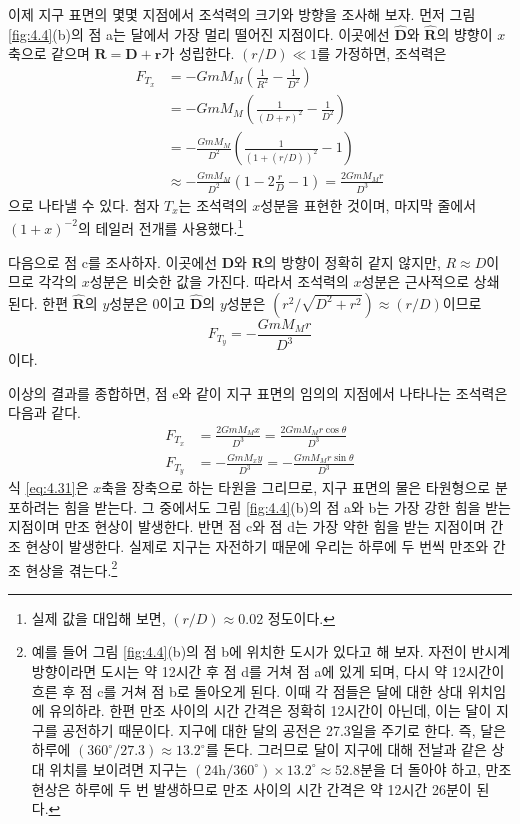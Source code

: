 \documentclass[chapter, oneside, b5paper]{oblivoir}
\theoremstyle{plain}
\theoremstyle{definition}
\theoremstyle{remark}
\begin{document}
이제 지구 표면의 몇몇 지점에서 조석력의 크기와 방향을 조사해 보자. 먼저 그림 \ref{fig:4.4}(b)의 점 a는 달에서 가장 멀리 떨어진 지점이다. 이곳에선 $\mathbf{\hat{D}}$와 $\mathbf{\hat{R}}$의 뱡향이 $x$축으로 같으며 $\mathbf{R} = \mathbf{D} + \mathbf{r}$가 성립한다. $(r/D) \ll 1$를 가정하면, 조석력은
\begin{equation}
\begin{aligned}
    F_{T_x} &= -GmM_M \left( \frac{1}{R^2} - \frac{1}{D^2} \right) \\
    &= -GmM_M \left( \frac{1}{(D+r)^2} - \frac{1}{D^2} \right) \\
    &= -\frac{GmM_M}{D^2} \left( \frac{1}{(1+(r/D))^2} - 1 \right) \\
    &\approx -\frac{GmM_M}{D^2} \left( 1-2\frac{r}{D}- 1 \right) = \frac{2GmM_Mr}{D^3}
\end{aligned}
\label{eq:4.29}
\end{equation}
으로 나타낼 수 있다. 첨자 $T_x$는 조석력의 $x$성분을 표현한 것이며, 마지막 줄에서 $(1+x)^{-2}$의 테일러 전개를 사용했다.\footnote{실제 값을 대입해 보면, $(r/D) \approx 0.02$ 정도이다.}

다음으로 점 c를 조사하자. 이곳에선 $\mathbf{D}$와 $\mathbf{R}$의 방향이 정확히 같지 않지만, $R \approx D$이므로 각각의 $x$성분은 비슷한 값을 가진다. 따라서 조석력의 $x$성분은 근사적으로 상쇄된다. 한편 $\mathbf{\hat{R}}$의 $y$성분은 0이고 $\mathbf{\hat{D}}$의 $y$성분은 $(r^2 / \sqrt{D^2 + r^2}) \approx (r/D)$이므로
\begin{equation}
    F_{T_y} = -\frac{GmM_M r}{D^3}
\end{equation}
이다.

이상의 결과를 종합하면, 점 e와 같이 지구 표면의 임의의 지점에서 나타나는 조석력은 다음과 같다.
\begin{equation}
    \begin{aligned}
        F_{T_x} &= \frac{2GmM_Mx}{D^3} = \frac{2GmM_Mr\cos{\theta}}{D^3} \\
        F_{T_y} &= -\frac{GmM_xy}{D^3} = -\frac{GmM_Mr\sin{\theta}}{D^3}
    \end{aligned}
    \label{eq:4.31}
\end{equation}
식 \ref{eq:4.31}은 $x$축을 장축으로 하는 타원을 그리므로, 지구 표면의 물은 타원형으로 분포하려는 힘을 받는다. 그 중에서도 그림 \ref{fig:4.4}(b)의 점 a와 b는 가장 강한 힘을 받는 지점이며 만조 현상이 발생한다. 반면 점 c와 점 d는 가장 약한 힘을 받는 지점이며 간조 현상이 발생한다. 실제로 지구는 자전하기 때문에 우리는 하루에 두 번씩 만조와 간조 현상을 겪는다.\footnote{예를 들어 그림 \ref{fig:4.4}(b)의 점 b에 위치한 도시가 있다고 해 보자. 자전이 반시계 방향이라면 도시는 약 12시간 후 점 d를 거쳐 점 a에 있게 되며, 다시 약 12시간이 흐른 후 점 c를 거쳐 점 b로 돌아오게 된다. 이때 각 점들은 달에 대한 상대 위치임에 유의하라. 한편 만조 사이의 시간 간격은 정확히 12시간이 아닌데, 이는 달이 지구를 공전하기 때문이다. 지구에 대한 달의 공전은 27.3일을 주기로 한다. 즉, 달은 하루에 $(360^{\circ}/27.3) \approx 13.2^{\circ}$를 돈다. 그러므로 달이 지구에 대해 전날과 같은 상대 위치를 보이려면 지구는 $(24\mathrm{h} / 360^{\circ}) \times 13.2^{\circ} \approx 52.8$분을 더 돌아야 하고, 만조 현상은 하루에 두 번 발생하므로 만조 사이의 시간 간격은 약 12시간 26분이 된다.}
\end{document}
